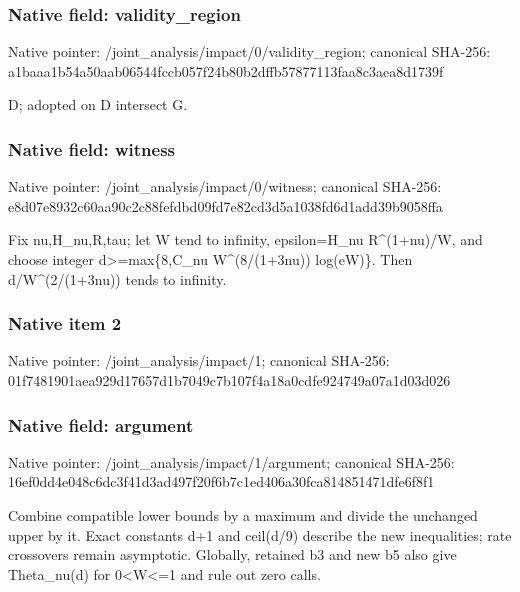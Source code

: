 \documentclass[10pt,a4paper]{article}
\begin{document}
\subsubsection{Native field: validity\_\allowbreak{}region}
Native pointer: /joint\_\allowbreak{}analysis/impact/0/validity\_\allowbreak{}region; canonical SHA-256: a1baaa1b54a50aab06544fccb057f24b80b2dffb57877113faa8c3aea8d1739f

\begingroup\raggedright\sloppy D;\allowbreak{} adopted on D intersect G.\par\endgroup

\subsubsection{Native field: witness}
Native pointer: /joint\_\allowbreak{}analysis/impact/0/witness; canonical SHA-256: e8d07e8932c60aa90c2c88fefdbd09fd7e82cd3d5a1038fd6d1add39b9058ffa

\begingroup\raggedright\sloppy Fix nu,\allowbreak{}H\_\allowbreak{}nu,\allowbreak{}R,\allowbreak{}tau;\allowbreak{} let W tend to infinity,\allowbreak{} epsilon=\allowbreak{}H\_\allowbreak{}nu R\textasciicircum{}(1+nu)/\allowbreak{}W,\allowbreak{} and choose integer d>=\allowbreak{}max\{8,\allowbreak{}C\_\allowbreak{}nu W\textasciicircum{}(8/\allowbreak{}(1+3nu)) log(eW)\}. Then d/\allowbreak{}W\textasciicircum{}(2/\allowbreak{}(1+3nu)) tends to infinity.\par\endgroup

\subsubsection{Native item 2}
Native pointer: /joint\_\allowbreak{}analysis/impact/1; canonical SHA-256: 01f7481901aea929d17657d1b7049c7b107f4a18a0cdfe924749a07a1d03d026

\subsubsection{Native field: argument}
Native pointer: /joint\_\allowbreak{}analysis/impact/1/argument; canonical SHA-256: 16ef0dd4e048c6dc3f41d3ad497f20f6b7c1ed406a30fca814851471dfe6f8f1

\begingroup\raggedright\sloppy Combine compatible lower bounds by a maximum and divide the unchanged upper by it. Exact constants d+1 and ceil(d/\allowbreak{}9) describe the new inequalities;\allowbreak{} rate crossovers remain asymptotic. Globally,\allowbreak{} retained b3 and new b5 also give Theta\_\allowbreak{}nu(d) for 0<W<=\allowbreak{}1 and rule out zero calls.\par\endgroup
\end{document}
